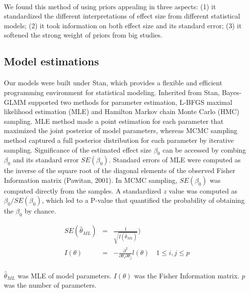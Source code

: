 \documentclass[12pt]{article}
\begin{document}
\paragraph{}{
We found this method of using priors appealing in three aspects: (1) it standardized the different interpretations of effect size from different statistical models; (2) it took information on both effect size and its standard error; (3) it softened the strong weight of priors from big studies.
}

\subsection*{Model estimations}

\paragraph{}{
Our models were built under Stan, which provides a flexible and efficient programming environment for statistical modeling. Inherited from Stan, Bayes-GLMM supported two methods for parameter estimation, L-BFGS maximal likelihood estimation (MLE) and Hamilton Markov chain Monte Carlo (HMC) sampling. MLE method made a point estimation for each parameter that maximized the joint posterior of model parameters, whereas MCMC sampling method captured a full posterior distribution for each parameter by iterative sampling. Significance of the estimated effect size $\beta_0$ can be accessed by combing $\beta_0$ and its standard error $SE(\beta_0)$. Standard errors of MLE were computed as the inverse of the square root of the diagonal elements of the observed Fisher Information matrix (Pawitan, 2001). In MCMC sampling, $SE(\beta_0)$ was computed directly from the samples. A standardized $z$ value was computed as $\beta_0 / SE(\beta_0)$, which led to a P-value that quantified the probability of obtaining the $\beta_0$ by chance.
}


\begin{eqnarray}
SE(\hat{\theta}_{ML}) & = & \frac{1}{\sqrt{I(\hat{\theta}_{ML})}}) \\
I(\theta) & = & - \frac{\partial^2}{\partial \theta_i \partial \theta_j} l(\theta) \quad 1 \leq i,j \leq p
\end{eqnarray}

\paragraph{}{
$\hat{\theta}_{ML}$ was MLE of model parameters. $I(\theta)$ was the Fisher Information matrix. $p$ was the number of parameters.
}
\end{document}
